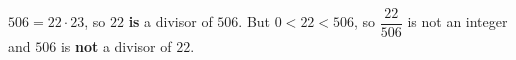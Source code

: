 $506=22\cdot23$, so $22$ \textbf{is} a divisor of $506$. But $0<22<506$, so $\dfrac{22}{506}$ is not an integer and $506$ is \textbf{not} a divisor of $22$.
